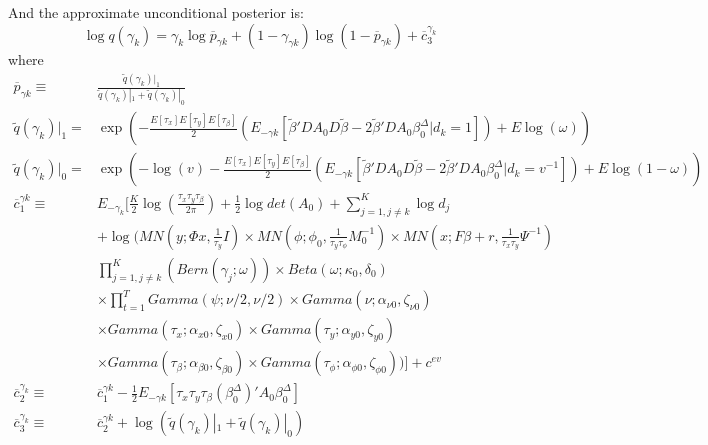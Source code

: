 \documentclass[11pt]{article}
\begin{document}
And the approximate unconditional posterior is:
\begin{equation}
	\log q\left(\gamma_{k}\right) = \gamma_{k}\log\overline{p}_{\gamma k}+\left(1-\gamma_{\gamma k}\right)\log\left(1-\overline{p}_{\gamma k}\right)+\overline{c}_{3}^{\gamma_{k}}
\end{equation}
where
\begin{align*}
	\overline{p}_{\gamma k}\equiv&\frac{\tilde{q}\left(\gamma_{k}\right)|_{1}}{\tilde{q}\left(\gamma_{k}\right)|_{1}+\tilde{q}\left(\gamma_{k}\right)|_{0}}\\\tilde{q}\left(\gamma_{k}\right)|_{1}=&\exp\left(-\frac{E\left[\tau_{x}\right]E\left[\tau_{y}\right]E\left[\tau_{\beta}\right]}{2}\left(E_{-\gamma k}\left[\tilde{\beta}'DA_{0}D\tilde{\beta}-2\tilde{\beta}'DA_{0}\beta_{0}^{\Delta}|d_{k}=1\right]\right)+E\log\left(\omega\right)\right)\\\tilde{q}\left(\gamma_{k}\right)|_{0}=&\exp\left(-\log\left(v\right)-\frac{E\left[\tau_{x}\right]E\left[\tau_{y}\right]E\left[\tau_{\beta}\right]}{2}\left(E_{-\gamma k}\left[\tilde{\beta}'DA_{0}D\tilde{\beta}-2\tilde{\beta}'DA_{0}\beta_{0}^{\Delta}|d_{k}=v^{-1}\right]\right)+E\log\left(1-\omega\right)\right)\\\overline{c}_{1}^{\gamma k}\equiv&E_{-\gamma_{k}}\Bigg[\frac{K}{2}\log\left(\frac{\tau_{x}\tau_{y}\tau_{\beta}}{2\pi}\right)+\frac{1}{2}\log det\left(A_{0}\right)+\sum_{j=1,j\ne k}^{K}\log d_{j}\\&+\log\Bigg(MN\left(y;\Phi x,\frac{1}{\tau_{y}}I\right)\times MN\left(\phi;\phi_{0},\frac{1}{\tau_{y}\tau_{\phi}}M_{0}^{-1}\right)\times MN\left(x;F\beta+r,\frac{1}{\tau_{x}\tau_{y}}\Psi^{-1}\right)\\&\prod_{j=1,j\ne k}^{K}\left(Bern\left(\gamma_{j};\omega\right)\right)\times Beta\left(\omega;\kappa_{0},\delta_{0}\right)\\&\times\prod_{t=1}^{T}Gamma\left(\psi;\nu/2,\nu/2\right)\times Gamma\left(\nu;\alpha_{\nu0},\zeta_{\nu0}\right)\\&\times Gamma\left(\tau_{x};\alpha_{x0},\zeta_{x0}\right)\times Gamma\left(\tau_{y};\alpha_{y0},\zeta_{y0}\right)\\&\times Gamma\left(\tau_{\beta};\alpha_{\beta0},\zeta_{\beta0}\right)\times Gamma\left(\tau_{\phi};\alpha_{\phi0},\zeta_{\phi0}\right)\Bigg)\Bigg]+c^{ev}\\\overline{c}_{2}^{\gamma_{k}}\equiv&\overline{c}_{1}^{\gamma k}-\frac{1}{2}E_{-\gamma k}\left[\tau_{x}\tau_{y}\tau_{\beta}\left(\beta_{0}^{\Delta}\right)'A_{0}\beta_{0}^{\Delta}\right]\\\overline{c}_{3}^{\gamma_{k}}\equiv&\overline{c}_{2}^{\gamma k}+\log\left(\tilde{q}\left(\gamma_{k}\right)|_{1}+\tilde{q}\left(\gamma_{k}\right)|_{0}\right)
\end{align*}
\end{document}
